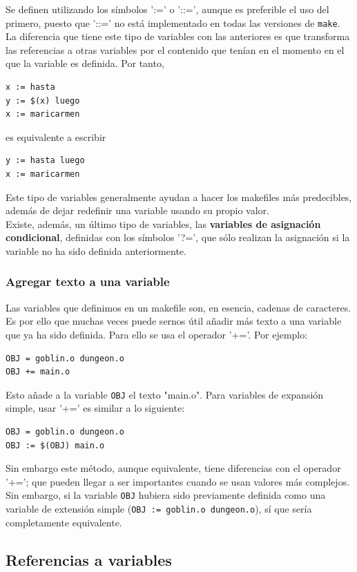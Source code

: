 \documentclass[11pt,twoside,titlepage,a4paper]{article}
\theoremstyle{definition}
\theoremstyle{plain_rojo}
\theoremstyle{remark}
\begin{document}
Se definen utilizando los símbolos ':=' o '::=', aunque es preferible el uso
del primero, puesto que '::=' no está implementado en todas las versiones de 
\texttt{make}. La diferencia que tiene este tipo de variables con las 
anteriores es que transforma las referencias a otras variables por el 
contenido que tenían en el momento en el que la variable es definida. Por 
tanto,
\bigskip
\begin{lstlisting}
x := hasta
y := $(x) luego
x := maricarmen
\end{lstlisting}
\bigskip
es equivalente a escribir
\bigskip
\begin{lstlisting}
y := hasta luego
x := maricarmen
\end{lstlisting}
\bigskip
Este tipo de variables generalmente ayudan a hacer los makefiles más 
predecibles, además de dejar redefinir una variable usando su propio valor.
\\

Existe, además, un último tipo de variables, las \textbf{variables de 
asignación condicional}, definidas con los símbolos '?=', que sólo realizan 
la asignación si la variable no ha sido definida anteriormente.

\subsubsection{Agregar texto a una variable}

Las variables que definimos en un makefile son, en esencia, cadenas de 
caracteres. Es por ello que muchas veces puede sernos útil añadir más texto a 
una variable que ya ha sido definida. Para ello se usa el operador '+='. Por 
ejemplo:
\bigskip
\begin{lstlisting}
OBJ = goblin.o dungeon.o
OBJ += main.o
\end{lstlisting}
\bigskip
Esto añade a la variable \texttt{OBJ} el texto "main.o". Para variables de expansión simple, usar '+=' es similar a lo siguiente:
\bigskip
\begin{lstlisting}
OBJ = goblin.o dungeon.o
OBJ := $(OBJ) main.o
\end{lstlisting}
\bigskip
Sin embargo este método, aunque equivalente, tiene diferencias con el operador
'+='; que pueden llegar a ser importantes cuando se usan valores más
complejos. Sin embargo, si la variable \texttt{OBJ} hubiera sido previamente 
definida como una variable de extensión simple (\texttt{OBJ := goblin.o 
dungeon.o}), sí que sería completamente equivalente.

\subsection{Referencias a variables}
\end{document}
